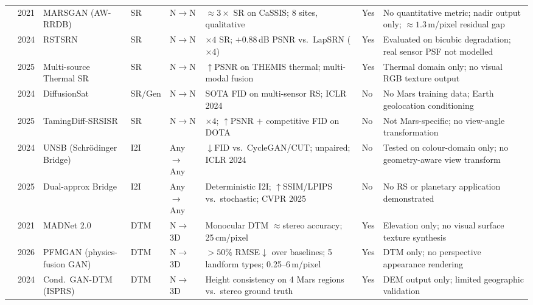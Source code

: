 \documentclass[10pt,journal]{IEEEtran}
\begin{document}
\begin{table}[!t]
\begin{tabular}{@{}p{0.45cm}lp{2.0cm}p{0.85cm}p{1.15cm}p{3.4cm}lp{4.4cm}@{}}
\cite{tao2021cassis}    & 2021 & MARSGAN (AW-RRDB)             & SR      & N$\to$N   & ${\approx}3\times$ SR on CaSSIS; 8 sites, qualitative          & Yes     & No quantitative metric; nadir output only; ${\approx}1.3$\,m/pixel residual gap \\
\cite{wu2024rstsrn}     & 2024 & RSTSRN                        & SR      & N$\to$N   & ${\times}4$ SR; $+$0.88\,dB PSNR vs.\ LapSRN (${\times}4$)   & Yes     & Evaluated on bicubic degradation; real sensor PSF not modelled \\
\cite{lu2025thermal}    & 2025 & Multi-source Thermal SR        & SR      & N$\to$N   & ${\uparrow}$PSNR on THEMIS thermal; multi-modal fusion          & Yes     & Thermal domain only; no visual RGB texture output \\
\cite{khanna2024diffusionsat} & 2024 & DiffusionSat             & SR/Gen  & N$\to$N   & SOTA FID on multi-sensor RS; ICLR 2024                          & No      & No Mars training data; Earth geolocation conditioning \\
\cite{zhu2025taming}    & 2025 & TamingDiff-SRSISR             & SR      & N$\to$N   & ${\times}4$; ${\uparrow}$PSNR $+$ competitive FID on DOTA      & No      & Not Mars-specific; no view-angle transformation \\
\midrule
\cite{kim2024unsb}      & 2024 & UNSB (Schr{\"o}dinger Bridge) & I2I     & Any$\to$Any & ${\downarrow}$FID vs.\ CycleGAN/CUT; unpaired; ICLR 2024      & No      & Tested on colour-domain only; no geometry-aware view transform \\
\cite{xiao2025brownian} & 2025 & Dual-approx Bridge            & I2I     & Any$\to$Any & Deterministic I2I; ${\uparrow}$SSIM/LPIPS vs.\ stochastic; CVPR 2025 & No & No RS or planetary application demonstrated \\
\midrule
\cite{tao2021madnet}    & 2021 & MADNet 2.0                    & DTM     & N$\to$3D  & Monocular DTM ${\approx}$stereo accuracy; 25\,cm/pixel          & Yes     & Elevation only; no visual surface texture synthesis \\
\cite{zou2026pfmgan}    & 2026 & PFMGAN (physics-fusion GAN)   & DTM     & N$\to$3D  & $>{50\%}$ RMSE${\downarrow}$ over baselines; 5 landform types; 0.25--6\,m/pixel & Yes & DTM only; no perspective appearance rendering \\
\cite{cao2024gen3d}     & 2024 & Cond.\ GAN-DTM (ISPRS)        & DTM     & N$\to$3D  & Height consistency on 4 Mars regions vs.\ stereo ground truth   & Yes     & DEM output only; limited geographic validation \\

\end{tabular}
\end{table}
\end{document}
